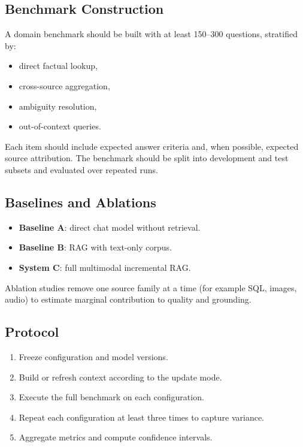 \documentclass[11pt,a4paper]{article}
\begin{document}
\subsection{Benchmark Construction}

A domain benchmark should be built with at least 150--300 questions, stratified by:
\begin{itemize}[leftmargin=1.2cm]
	\item direct factual lookup,
	\item cross-source aggregation,
	\item ambiguity resolution,
	\item out-of-context queries.
\end{itemize}

Each item should include expected answer criteria and, when possible, expected source attribution. The benchmark should be split into development and test subsets and evaluated over repeated runs.

\subsection{Baselines and Ablations}

\begin{itemize}[leftmargin=1.2cm]
	\item \textbf{Baseline A}: direct chat model without retrieval.
	\item \textbf{Baseline B}: RAG with text-only corpus.
	\item \textbf{System C}: full multimodal incremental RAG.
\end{itemize}

Ablation studies remove one source family at a time (for example SQL, images, audio) to estimate marginal contribution to quality and grounding.

\subsection{Protocol}

\begin{enumerate}[leftmargin=1.2cm]
	\item Freeze configuration and model versions.
	\item Build or refresh context according to the update mode.
	\item Execute the full benchmark on each configuration.
	\item Repeat each configuration at least three times to capture variance.
	\item Aggregate metrics and compute confidence intervals.
\end{enumerate}
\end{document}
